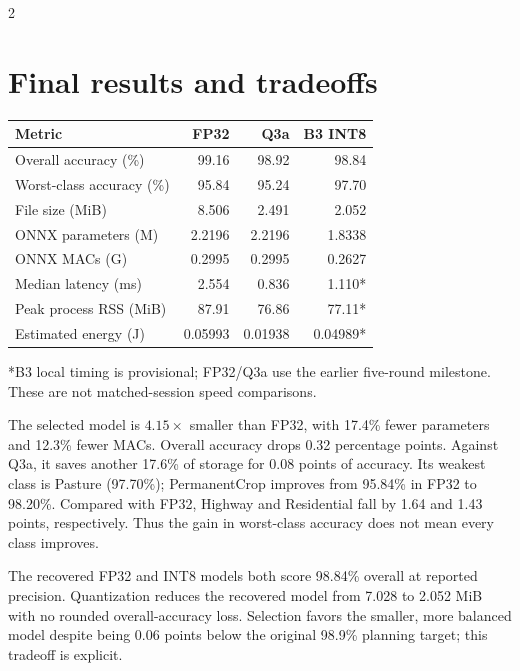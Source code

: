 \documentclass[10pt,letterpaper]{article}
\begin{document}
\begin{multicols}{2}\raggedcolumns
\section{Final results and tradeoffs}
\begin{center}\begin{minipage}{\linewidth}\centering
{}
\label{tab:final}\small\setlength{\tabcolsep}{3pt}
\begin{tabular}{@{}lrrr@{}}\toprule
\rowcolor{slate}\textbf{Metric} & \textbf{FP32} & \textbf{Q3a} & \textbf{B3 INT8}\\\midrule
\rowcolor{pale}Overall accuracy (\%) & 99.16 & 98.92 & 98.84\\
Worst-class accuracy (\%) & 95.84 & 95.24 & 97.70\\
\rowcolor{pale}File size (MiB) & 8.506 & 2.491 & 2.052\\
ONNX parameters (M) & 2.2196 & 2.2196 & 1.8338\\
\rowcolor{pale}ONNX MACs (G) & 0.2995 & 0.2995 & 0.2627\\
Median latency (ms) & 2.554 & 0.836 & 1.110*\\
Peak process RSS (MiB) & 87.91 & 76.86 & 77.11*\\
Estimated energy (J) & 0.05993 & 0.01938 & 0.04989*\\\bottomrule
\end{tabular}\par\vspace{3pt}\raggedright\footnotesize
*B3 local timing is provisional; FP32/Q3a use the earlier five-round milestone. These are not matched-session speed comparisons.\end{minipage}\end{center}

The selected model is $4.15\times$ smaller than FP32, with 17.4\% fewer parameters and 12.3\% fewer MACs. Overall accuracy drops 0.32 percentage points. Against Q3a, it saves another 17.6\% of storage for 0.08 points of accuracy. Its weakest class is Pasture (97.70\%); PermanentCrop improves from 95.84\% in FP32 to 98.20\%. Compared with FP32, Highway and Residential fall by 1.64 and 1.43 points, respectively. Thus the gain in worst-class accuracy does not mean every class improves.

The recovered FP32 and INT8 models both score 98.84\% overall at reported precision. Quantization reduces the recovered model from 7.028 to 2.052 MiB with no rounded overall-accuracy loss. Selection favors the smaller, more balanced model despite being 0.06 points below the original 98.9\% planning target; this tradeoff is explicit.


\end{multicols}
\end{document}
